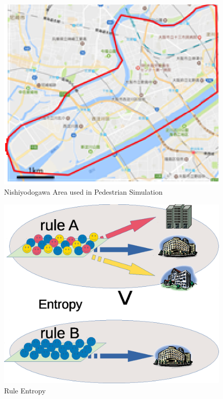 \begin{figure}
  \centering
  \includegraphics[width=.8\linewidth]{Figs.noda/figure-08.nishiyodogawa.eps}
  \caption{Nishiyodogawa Area used in Pedestrian Simulation}
  \label{fig:Figs.noda/figure-08.nishiyodogawa.eps}
\end{figure}

\begin{figure}
  \centering
  \includegraphics[width=.8\linewidth]{Figs.noda/figure-09.evac_rule.eps}
  \caption{Rule Entropy}
  \label{fig:Figs.noda/figure-09.evac_rule.eps}
\end{figure}

